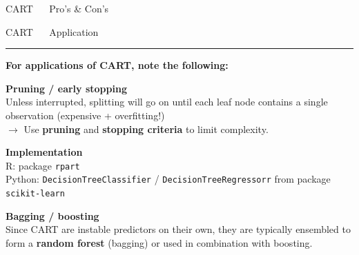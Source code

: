 \documentclass[11pt,compress,t,notes=noshow, xcolor=table]{beamer}
\begin{document}
\begin{frame}{\textcolor{gray!80}{CART} ~~ Pro's \& Con's}
\vfill

\small


\end{frame}


\LARGE
\begin{frame}{\textcolor{gray!80}{CART} ~~ Application}
\normalsize
\vspace{-0.5cm}
\noindent \textcolor{gray!80}{\rule{\textwidth}{1pt}}

\vspace{0.3cm}

\small

\textbf{For applications of CART, note the following:}
\lz

\textbf{\textcolor{gray!80}{Pruning / early stopping}} \\
\smallskip
Unless interrupted, splitting will go on until each leaf node contains a single 
observation (expensive + overfitting!) \\
\smallskip
$\rightarrow$ Use \textbf{pruning} and \textbf{stopping criteria} to limit 
complexity.

\lz
\textbf{\textcolor{gray!80}{Implementation}} \\
\smallskip
R: package \texttt{rpart}\\
Python: \texttt{DecisionTreeClassifier} / \texttt{DecisionTreeRegressorr} from 
package \texttt{scikit-learn}

\lz
\textbf{\textcolor{gray!80}{Bagging / boosting}} \\
\smallskip
Since CART are instable predictors on their own, they are typically ensembled
to form a \textbf{random forest} (bagging) or used in combination with boosting.

\end{frame}

\end{document}
